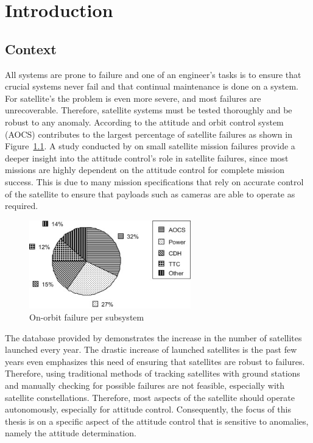 %
%


\chapter{Introduction}
\label{chap:Introduction}
\section{Context}
All systems are prone to failure and one of an engineer's tasks is to ensure that crucial systems never fail and that continual maintenance is done on a system. For satellite's the problem is even more severe, and most failures are unrecoverable. Therefore, satellite systems must be tested thoroughly and be robust to any anomaly. According to \cite{tafazoli2009study} the attitude and orbit control system (AOCS) contributes to the largest percentage of satellite failures as shown in Figure~\ref{fig:OnOrbitFailureSubsystem}. A study conducted by \cite{Jacklin2019} on small satellite mission failures provide a deeper insight into the attitude control's role in satellite failures, since most missions are highly dependent on the attitude control for complete mission success. This is due to many mission specifications that rely on accurate control of the satellite to ensure that payloads such as cameras are able to operate as required.

\begin{figure}[!htb]
	\centering
	\includegraphics[width = 7cm]{Figures/OnOrbitFailureDistribution.jpg}
	\caption{On-orbit failure per subsystem \cite{tafazoli2009study}}
	\label{fig:OnOrbitFailureSubsystem}
\end{figure}
The database provided by \cite{swartwout2015cubesat} demonstrates the increase in the number of satellites launched every year. The drastic increase of launched satellites is the past few years even emphasizes this need of ensuring that satellites are robust to failures. Therefore, using traditional methods of tracking satellites with ground stations and manually checking for possible failures are not feasible, especially with satellite constellations. Therefore, most aspects of the satellite should operate autonomously, especially for attitude control. Consequently, the focus of this thesis is on a specific aspect of the attitude control that is sensitive to anomalies, namely the attitude determination. 


